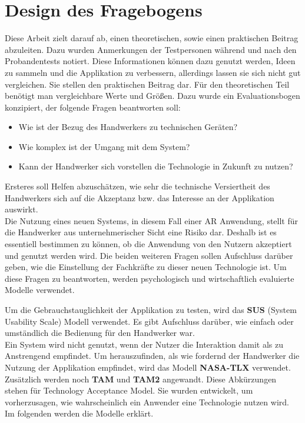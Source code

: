 \section{Design des Fragebogens}
\label{fragebogen}

Diese Arbeit zielt darauf ab, einen theoretischen, sowie einen praktischen Beitrag abzuleiten. Dazu wurden Anmerkungen der Testpersonen während und nach den Probandentests notiert. Diese Informationen können dazu genutzt werden, Ideen zu sammeln und die Applikation zu verbessern, allerdings lassen sie sich nicht gut vergleichen. Sie stellen den praktischen Beitrag dar. Für den theoretischen Teil benötigt man vergleichbare Werte und Größen. Dazu wurde ein Evaluationsbogen konzipiert, der folgende Fragen beantworten soll:

\begin{itemize}
	\item Wie ist der Bezug des Handwerkers zu technischen Geräten?
	\item Wie komplex ist der Umgang mit dem System?
	\item Kann der Handwerker sich vorstellen die Technologie in Zukunft zu nutzen?
\end{itemize}

Ersteres soll Helfen abzuschätzen, wie sehr die technische Versiertheit des Handwerkers sich auf die Akzeptanz bzw. das Interesse an der Applikation auswirkt. \\
Die Nutzung eines neuen Systems, in diesem Fall einer AR Anwendung, stellt für die Handwerker aus unternehmerischer Sicht eine Risiko dar. Deshalb ist es essentiell bestimmen zu können, ob die Anwendung von den Nutzern akzeptiert und genutzt werden wird. Die beiden weiteren Fragen sollen Aufschluss darüber geben, wie die Einstellung der Fachkräfte zu dieser neuen Technologie ist. Um diese Fragen zu beantworten, werden psychologisch und wirtschaftlich evaluierte Modelle verwendet. 

Um die Gebrauchstauglichkeit der Applikation zu testen, wird das \textbf{SUS} (System Usability Scale) \cite{brooke_sus_nodate} Modell verwendet. Es gibt Aufschluss darüber, wie einfach oder umständlich die Bedienung für den Handwerker war. \\
Ein System wird nicht genutzt, wenn der Nutzer die Interaktion damit als zu Anstrengend empfindet. Um herauszufinden, als wie fordernd der Handwerker die Nutzung der Applikation empfindet, wird das Modell \textbf{NASA-TLX} verwendet. \\
Zusätzlich werden noch \textbf{TAM} und \textbf{TAM2} angewandt. Diese Abkürzungen stehen für Technology Acceptance Model. Sie wurden entwickelt, um vorherzusagen, wie wahrscheinlich ein Anwender eine Technologie nutzen wird. \\
Im folgenden werden die Modelle erklärt.

